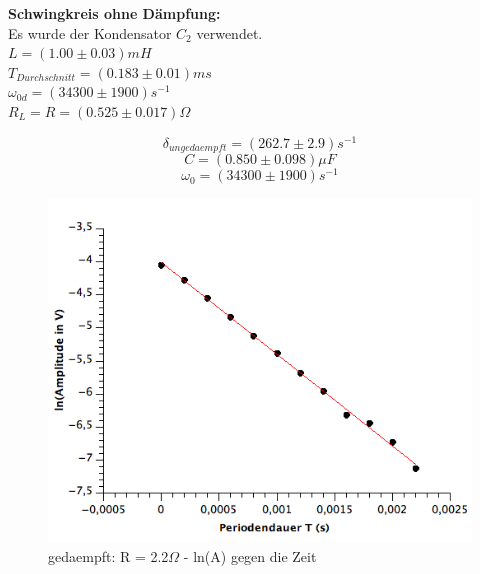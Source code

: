 \documentclass[12pt,a4paper]{article}
\begin{document}
\begin{multicols}{2}



\noindent \textbf{Schwingkreis ohne Dämpfung:}\\

\noindent Es wurde der Kondensator $C_2$ verwendet.\\

\noindent $L=(1.00 \pm 0.03)mH$\\
$T_{Durchschnitt}%
= (0.183 \pm 0.01)ms$\\
$\omega_{0d} = (34300 \pm 1900)s^{-1}$\\
$R_L = R = (0.525 \pm 0.017)\Omega$

$$\delta_{ungedaempft} = (262.7 \pm 2.9)s^{-1}$$
$$C = (0.850 \pm 0.098)\mu F$$
$$\omega_{0} = (34300\pm 1900)s^{-1}$$



\end{multicols}
\begin{figure}[H]
	\centering
	\includegraphics[scale=0.7]{./figure/Schwingkreis_mit2-2ohm-daempfung.png}
	\caption{gedaempft: R = 2.2$\Omega$ - ln(A) gegen die Zeit}
	\label{fig:schwingkreis_2ohmdaempfung}
\end{figure}
\end{document}
